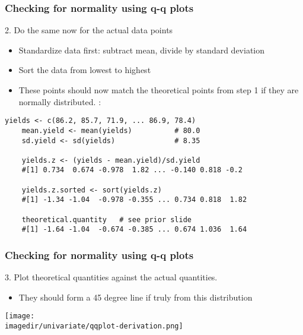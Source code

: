 \begin{frame}[fragile]\frametitle{Checking for normality using q-q plots}
	2. Do the same now for the actual data points
	\begin{itemize}
		\item	Standardize data first: subtract mean, divide by standard deviation
		\item	Sort the data from lowest to highest
		\item	These points should now match the theoretical points from step 1 if they are normally distributed. \emph{{\color{myGreen}{Example}}}:
	\end{itemize}

	\begin{lstlisting}[R]
	yields <- c(86.2, 85.7, 71.9, ... 86.9, 78.4)
	mean.yield <- mean(yields)          # 80.0
	sd.yield <- sd(yields)              # 8.35

	yields.z <- (yields - mean.yield)/sd.yield
	#[1] 0.734  0.674 -0.978  1.82 ... -0.140 0.818 -0.2

	yields.z.sorted <- sort(yields.z)
	#[1] -1.34 -1.04  -0.978 -0.355 ... 0.734 0.818  1.82

	theoretical.quantity   # see prior slide
	#[1] -1.64 -1.04  -0.674 -0.385 ... 0.674 1.036  1.64
	\end{lstlisting}
\end{frame}

\begin{frame}\frametitle{Checking for normality using q-q plots}

	3. Plot theoretical quantities against the actual quantities.
	\begin{itemize}
		\item	\small They should form a 45 degree line if truly from this distribution
	\end{itemize}
	\begin{center}
		\texttt{[image: \\imagedir/univariate/qqplot-derivation.png]}
	\end{center}
\end{frame}

